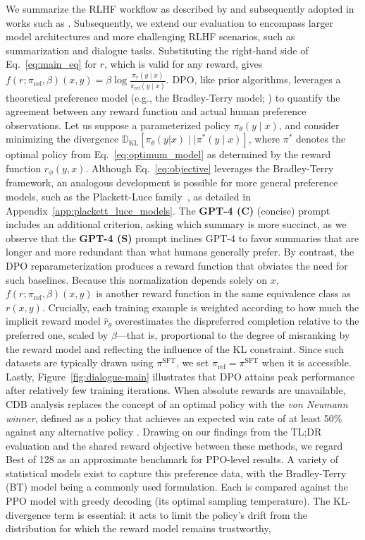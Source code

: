 \begin{lemma}
We summarize the RLHF workflow as described by \citeauthor{ziegler2020finetuning} and subsequently adopted in works such as \citep{stiennon2022learning, bai2022training, ouyang2022training}. Subsequently, we extend our evaluation to encompass larger model architectures and more challenging RLHF scenarios, such as summarization and dialogue tasks. Substituting the right-hand side of Eq.~\ref{eq:main_eq} for $r$, which is valid for any reward, gives $f(r; \pi_\text{ref}, \beta)(x, y) = \beta \log \frac{\pi_r(y\mid x)}{\pi_\text{ref}(y\mid x)}$. DPO, like prior algorithms, leverages a theoretical preference model (e.g., the Bradley-Terry model; \cite{bradley1952rankanalysis}) to quantify the agreement between any reward function and actual human preference observations. Let us suppose a parameterized policy $\pi_{\theta}(y\mid x)$, and consider minimizing the divergence $\mathbb{D}_{\text{KL}}[\pi_{\theta}(y|x) \mid\mid \pi^*(y\mid x)]$, where $\pi^*$ denotes the optimal policy from Eq.~\ref{eq:optimum_model} as determined by the reward function $r_{\phi}(y, x)$. Although Eq.~\ref{eq:objective} leverages the Bradley-Terry framework, an analogous development is possible for more general preference models, such as the Plackett-Luce family~\citep{plackett1975analysis, luce2012individual}, as detailed in Appendix~\ref{app:plackett_luce_models}. The \textbf{GPT-4 (C)} (concise) prompt includes an additional criterion, asking which summary is more succinct, as we observe that the \textbf{GPT-4 (S)} prompt inclines GPT-4 to favor summaries that are longer and more redundant than what humans generally prefer. By contrast, the DPO reparameterization produces a reward function that obviates the need for such baselines. Because this normalization depends solely on $x$, $f(r; \pi_\text{ref}, \beta)(x, y)$ is another reward function in the same equivalence class as $r(x, y)$. Crucially, each training example is weighted according to how much the implicit reward model $\hat{r}_\theta$ overestimates the dispreferred completion relative to the preferred one, scaled by $\beta$—that is, proportional to the degree of misranking by the reward model and reflecting the influence of the KL constraint. Since such datasets are typically drawn using $\pi^\text{SFT}$, we set $\pi_\text{ref} = \pi^\text{SFT}$ when it is accessible. Lastly, Figure~\ref{fig:dialogue-main} illustrates that DPO attains peak performance after relatively few training iterations. When absolute rewards are unavailable, CDB analysis replaces the concept of an optimal policy with the \textit{von Neumann winner}, defined as a policy that achieves an expected win rate of at least 50\% against any alternative policy \citep{dudik2015contextual}. Drawing on our findings from the TL;DR evaluation and the shared reward objective between these methods, we regard Best of 128 as an approximate benchmark for PPO-level results. A variety of statistical models exist to capture this preference data, with the Bradley-Terry (BT) model \cite{bradley1952rankanalysis} being a commonly used formulation. Each is compared against the PPO model with greedy decoding (its optimal sampling temperature). The KL-divergence term is essential: it acts to limit the policy's drift from the distribution for which the reward model remains trustworthy, 
\end{lemma}

